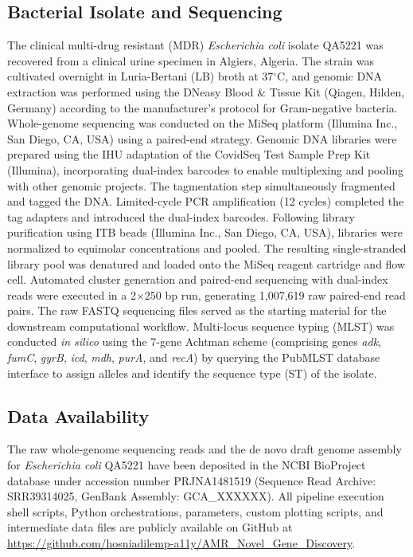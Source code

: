 \documentclass[pdflatex,sn-mathphys-num]{sn-jnl}
\begin{document}
\subsection{Bacterial Isolate and Sequencing}\label{subsec:isolate}
The clinical multi-drug resistant (MDR) \textit{Escherichia coli} isolate QA5221 was recovered from a clinical urine specimen in Algiers, Algeria. The strain was cultivated overnight in Luria-Bertani (LB) broth at 37\(^\circ\)C, and genomic DNA extraction was performed using the DNeasy Blood \& Tissue Kit (Qiagen, Hilden, Germany) according to the manufacturer's protocol for Gram-negative bacteria. Whole-genome sequencing was conducted on the MiSeq platform (Illumina Inc., San Diego, CA, USA) using a paired-end strategy. Genomic DNA libraries were prepared using the IHU adaptation of the CovidSeq Test Sample Prep Kit (Illumina), incorporating dual-index barcodes to enable multiplexing and pooling with other genomic projects. The tagmentation step simultaneously fragmented and tagged the DNA. Limited-cycle PCR amplification (12 cycles) completed the tag adapters and introduced the dual-index barcodes. Following library purification using ITB beads (Illumina Inc., San Diego, CA, USA), libraries were normalized to equimolar concentrations and pooled. The resulting single-stranded library pool was denatured and loaded onto the MiSeq reagent cartridge and flow cell. Automated cluster generation and paired-end sequencing with dual-index reads were executed in a 2\(\times\)250 bp run, generating 1,007,619 raw paired-end read pairs. The raw FASTQ sequencing files served as the starting material for the downstream computational workflow. Multi-locus sequence typing (MLST) was conducted \textit{in silico} using the 7-gene Achtman scheme (comprising genes \textit{adk}, \textit{fumC}, \textit{gyrB}, \textit{icd}, \textit{mdh}, \textit{purA}, and \textit{recA}) by querying the PubMLST database interface \cite{jolley2018open} to assign alleles and identify the sequence type (ST) of the isolate.

\subsection{Data Availability}\label{subsec:data_avail}
The raw whole-genome sequencing reads and the de novo draft genome assembly for \textit{Escherichia coli} QA5221 have been deposited in the NCBI BioProject database under accession number PRJNA1481519 (Sequence Read Archive: SRR39314025, GenBank Assembly: GCA\_XXXXXX). %
All pipeline execution shell scripts, Python orchestrations, parameters, custom plotting scripts, and intermediate data files are publicly available on GitHub at \href{https://github.com/hosniadilemp-a11y/AMR_Novel_Gene_Discovery}{https://github.com/hosniadilemp-a11y/AMR\_Novel\_Gene\_Discovery}.
\end{document}
